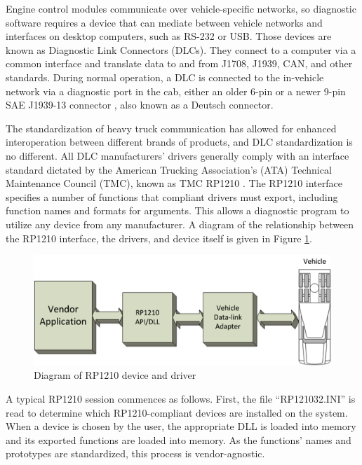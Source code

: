 
Engine control modules communicate over vehicle-specific networks, so diagnostic software requires a device that can mediate between
vehicle networks and interfaces on desktop computers, such as RS-232 or USB. Those devices are known as Diagnostic Link Connectors (DLCs).
They connect to a computer via a common interface and translate data to and from J1708, J1939, CAN, and other standards. During normal
operation, a DLC is connected to the in-vehicle network via a diagnostic port in the cab, either an older 6-pin or a newer 9-pin SAE J1939-13 connector \cite{J1939-13},
also known as a Deutsch connector.

The standardization of heavy truck communication has allowed for enhanced interoperation between different brands of products, and DLC
standardization is no different. All DLC manufacturers' drivers generally comply with an interface standard dictated by the American Trucking Association's (ATA)
Technical Maintenance Council (TMC), known as TMC RP1210 \cite{RP1210}. The RP1210 interface specifies a number of functions that compliant drivers must export,
including function names and formats for arguments. This allows a diagnostic program to utilize any device from any manufacturer. A diagram of the relationship between
the RP1210 interface, the drivers, and device itself is given in Figure \ref{fig:rp1210}.

\begin{figure}[h]
  \centering
  \includegraphics{RP1210}
  \caption{Diagram of RP1210 device and driver}
  \label{fig:rp1210}
\end{figure}


A typical RP1210 session commences as follows. First, the file ``RP121032.INI'' is read to determine which RP1210-compliant devices are installed
on the system. When a device is chosen by the user, the appropriate DLL is loaded into memory and its exported functions are loaded into memory.
As the functions' names and prototypes are standardized, this process is vendor-agnostic.

